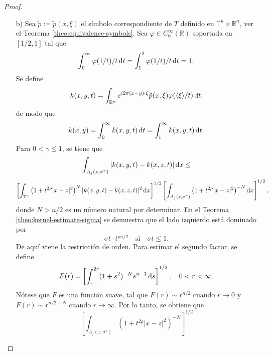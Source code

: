 \begin{proof}
\begin{itemize}
		\item[b)] Sea $\tilde{p}:=\tilde{p}(x,\xi)$ el símbolo correspondiente de $T$ definido en $\mathbb{T}^n \times \mathbb{R}^n$, ver el Teorema \ref{theo:equivalence-symbols}.  Sea $\varphi \in C_0^\infty(\mathbb{R})$ soportada en $[1/2, 1]$ tal que  
		\begin{equation*}
			\int_0^\infty \varphi(1/t)/t\mathop{}\!\mathrm{d} t = \int_1^2 \varphi(1/t)/t\mathop{}\!\mathrm{d} t=1.
		\end{equation*}
		Se define 
		\begin{equation*}
			k(x, y, t) = \int_{\mathbb{R}^n} e^{i2\pi (x-y) \cdot \xi} \tilde{p}(x, \xi) \varphi(\langle\xi\rangle/t)\mathop{}\!\mathrm{d} t,
		\end{equation*}
		de modo que 
		\begin{equation*}
			k(x, y) = \int_0^\infty k(x, y, t) \mathop{}\!\mathrm{d} t = \int_1^\infty k(x, y, t) \mathop{}\!\mathrm{d} t.
		\end{equation*}
		Para $0<\gamma\leq1$, se tiene que 
		\begin{equation*}
			\int_{A_j(z, \sigma^\gamma)} |k(x, y, t) - k(x, z, t)| \mathop{}\!\mathrm{d} x \leq
		\end{equation*}
		\begin{equation*}
			\left[ \int_{\mathbb{T}^n} \left(1 + t^{2\rho} |x-z|^2\right)^N 
			|k(x, y, t) - k(x, z, t)|^2 \mathop{}\!\mathrm{d} x
			\right]^{1/2}  \left[ \int_{A_j(z, \sigma^\gamma)} \left(1 + t^{2\rho} |x-z|^2\right)^{-N} \mathop{}\!\mathrm{d} x  \right]^{1/2},
		\end{equation*}
		donde $N>n/2$ es un número natural por determinar. En el Teorema  \ref{theo:kernel-estimate-sigma}  se demuestra que el lado izquierdo está dominado por 
		\begin{equation*}
			\sigma t \cdot t^{\rho n/2} \quad \text{si} \quad \sigma t\leq 1. 
		\end{equation*}
		De aquí viene la restricción de orden. Para estimar el segundo factor, se define 
		\begin{equation*}
			F(r) = \left[ \int_r^{2r} (1+s^2)^{-N} s^{n-1} \mathop{}\!\mathrm{d} s  \right]^{1/2}, \quad 0<r<\infty. 
		\end{equation*}
		Nótese que $F$ es una función suave, tal que $F(r) \sim r^{n/2}$ cuando $r\rightarrow 0$ y $F(r)\sim r^{n/2-N}$ cuando $r \rightarrow \infty$. Por lo tanto, se obtiene que
		\begin{equation*}
			\left[ \int_{A_j(z, \sigma^\gamma)} \left(1 + t^{2\rho} |x-z|^2\right)^{-N}  \right]^{1/2}
		\end{equation*}
		\begin{equation*}

\end{equation*}
\end{itemize}
\end{proof}
